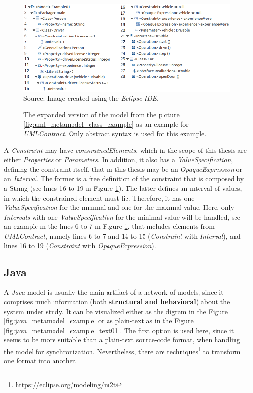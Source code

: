 \documentclass[tuberlin,cic,tc,english,noabntcite, oneside]{iiufrgs}
\begin{document}
\begin{figure}[H]
	\centering
    \caption{The expanded version of the model from the picture \ref{fig:uml_metamodel_class_example} as an example for \emph{UMLContract}. Only abstract syntax is used for this example.}
    \includegraphics[width=\textwidth]{umlContractDiagramExample01} \\
    Source: Image created using the \emph{Eclipse IDE}.
    \label{fig:uml_metamodel_contracts_example}
\end{figure}

A \emph{Constraint} may have \emph{constrainedElements}, which in the scope of this thesis are either \emph{Properties} or \emph{Parameters}. In addition, it also has a \emph{ValueSpecification}, defining the constraint itself, that in this thesis may be an \emph{OpaqueExpression} or an \emph{Interval}. The former is a free definition of the constraint that is composed by a String (see lines 16 to 19 in Figure \ref{fig:uml_metamodel_contracts_example}). The latter defines an interval of values, in which the constrained element must lie. Therefore, it has one \emph{ValueSpecification} for the minimal and one for the maximal value. Here, only \emph{Intervals} with one \emph{ValueSpecification} for the minimal value will be handled, see an example in the lines 6 to 7 in Figure \ref{fig:uml_metamodel_contracts_example}, that includes elements from \emph{UMLContract}, namely lines 6 to 7 and 14 to 15 (\emph{Constraint} with \emph{Interval}), and lines 16 to 19 (\emph{Constraint} with \emph{OpaqueExpression}).

\subsection{Java}
A \emph{Java} model is usually the main artifact of a network of models, since it comprises much information (both \textbf{structural and behavioral}) about the system under study. It can be visualized either as the digram in the Figure \ref{fig:java_metamodel_example} or as plain-text as in the Figure \ref{fig:java_metamodel_example_text01}. The first option is used here, since it seems to be more suitable than a plain-text source-code format, when handling the model for synchronization. Nevertheless, there are techniques\footnote{https://eclipse.org/modeling/m2t} to transform one format into another.
\end{document}
